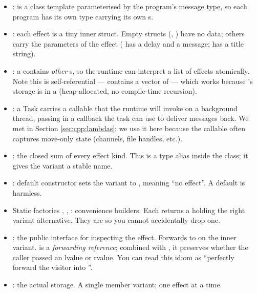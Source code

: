 \begin{itemize}[leftmargin=*]
  \item {}:  is a class
    template parameterised by the program's message type, so each
    program has its own  type carrying its own
    s.
  \item {}: each
    effect is a tiny inner struct. Empty structs (,
    ) have no data; others carry the parameters of the
    effect ( has a delay and a message;
     has a title string).
  \item {}: a
     contains \emph{other} s, so the runtime
    can interpret a list of effects atomically. Note this is
    self-referential ---  contains a vector of
     --- which works because 's storage is
    in a  (heap-allocated, no compile-time
    recursion).
  \item {}: a Task carries a callable that the runtime will invoke on
    a background thread, passing in a callback the task can use to
    deliver messages back. We met
     in Section
    \ref{sec:cpp:lambdas}; we use it here because the callable
    often captures move-only state (channels, file handles, etc.).
  \item {}: the
    closed sum of every effect kind. This is a type alias inside
    the class; it gives the variant a stable name.
  \item {}: default constructor sets
    the variant to , meaning ``no effect''. A default
     is harmless.
  \item Static factories , ,
    : convenience builders. Each returns a
     holding the right variant alternative. They are
    \code{[[nodiscard]]} so you cannot accidentally drop one.
  \item {}: the public interface for inspecting the effect.
    Forwards to  on the inner variant.
     is a \emph{forwarding reference}; combined
    with , it preserves whether the caller
    passed an lvalue or rvalue. You can read this idiom as
    ``perfectly forward the visitor into ''.
  \item {}: the actual storage. A single member
    variant; one effect at a time.
\end{itemize}

